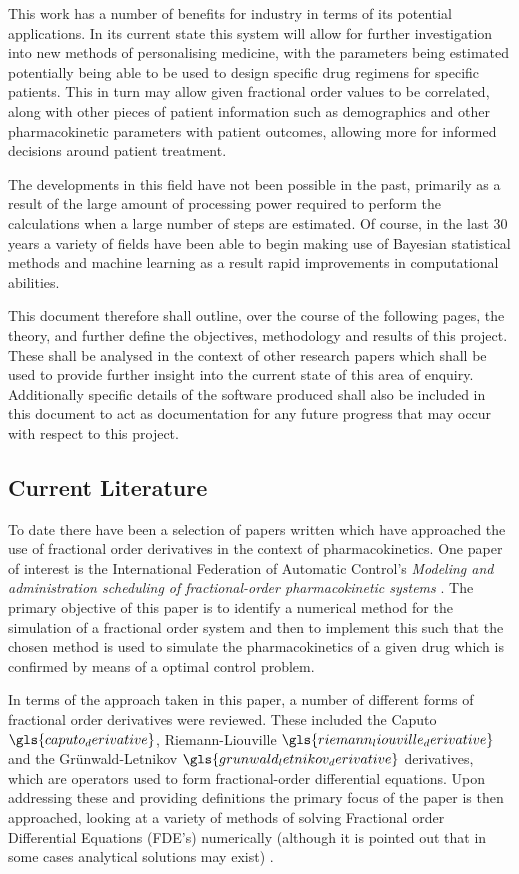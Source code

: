 This work has a number of benefits for industry in terms of its potential applications. In its current state this system will allow for further investigation into new methods of personalising medicine, with the parameters being estimated potentially being able to be used to design specific drug regimens for specific patients. This in turn may allow given fractional order values to be correlated, along with other pieces of patient information such as demographics and other pharmacokinetic parameters with patient outcomes, allowing more for informed decisions around patient treatment.

The developments in this field have not been possible in the past, primarily as a result of the large amount of processing power required to perform the calculations when a large number of steps are estimated. Of course, in the last 30 years a variety of fields have been able to begin making use of Bayesian statistical methods and machine learning as a result rapid improvements in computational abilities.

This document therefore shall outline, over the course of the following pages, the theory, and further define the objectives, methodology and results of this project. These shall be analysed in the context of other research papers which shall be used to provide further insight into the current state of this area of enquiry. Additionally specific details of the software produced shall also be included in this document to act as documentation for any future progress that may occur with respect to this project.

\subsection{Current Literature} \label{current_literature}

To date there have been a selection of papers written which have approached the use of fractional order derivatives in the context of pharmacokinetics. One paper of interest is the International Federation of Automatic Control's \textit{Modeling and administration scheduling of fractional-order pharmacokinetic systems} \cite{Modeling_and_administration_scheduling}. The primary objective of this paper is to identify a numerical method for the simulation of a fractional order system and then to implement this such that the chosen method is used to simulate the pharmacokinetics of a given drug which is confirmed by means of a optimal control problem. 

In terms of the approach taken in this paper, a number of different forms of fractional order derivatives were reviewed. These included the Caputo $\gls{caputo_derivative}$, Riemann-Liouville $\gls{riemann_liouville_derivative}$ and the Gr\"{u}nwald-Letnikov $\gls{grunwald_letnikov_derivative}$ derivatives, which are operators used to form fractional-order differential equations. Upon addressing these and providing definitions the primary focus of the paper is then approached, looking at a variety of methods of solving Fractional order Differential Equations (FDE's) numerically (although it is pointed out that in some cases analytical solutions may exist) \cite{garrappa2015numerical}. 


